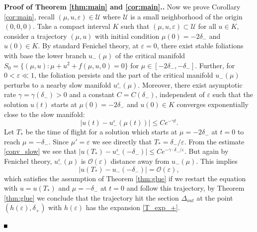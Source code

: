 \documentclass[letterpaper,11pt]{article}
\newcommand{\rmO}{\mathcal{O}}
\newcommand{\eps}{\varepsilon}
\numberwithin{equation}{section}
\theoremstyle{plain}
\newenvironment{Proof}[1][\unskip]%
 {\begin{trivlist} \item[]{\bf Proof #1. }}%
 {\hspace*{\fill}$\rule{.4\baselineskip}{.4\baselineskip}$\end{trivlist}}
\begin{document}
\begin{Proof}[\textbf{ of Theorem \ref{thm:main} and \ref{cor:main}}.]
Now we prove Corollary \ref{cor:main}, recall $(\mu,u,\eps) \in \mathcal{U}$ where $\mathcal{U}$ is a small neighborhood of the origin $(0,0,0)$. Take a compact interval $K$ such that $(\mu, u, \eps) \subset \mathcal{U}$ for all $u \in K$, consider a trajectory $(\mu, u)$ with initial condition $\mu(0) = -2\delta_-$ and $u(0) \in K$. By standard Fenichel theory, at $\eps = 0$, there exist stable foliations with base the lower branch $u_-(\mu)$ of  the critical manifold $S_0=\{ (\mu, u) : \mu+u^2 + f(\mu, u,0) =0 \}$ for $\mu \in [-2\delta_-, -\delta_-]$. Further, for $0<\eps \ll 1$, the foliation persists and the part of the critical manifold $u_-(\mu)$ perturbs to a nearby slow manifold $u_-^{\eps}(\mu)$. Moreover, there exist asymptotic rate $\gamma = \gamma(\delta_-)>0$ and a constant $C=C(\delta_-)$, independent of $\eps$ such that the solution $u(t)$ starts at $\mu(0)=-2\delta_-$ and $u(0) \in K$ converges exponentially close to the slow manifold:
\begin{equation}\label{conv_slow}
|u(t) - u_-^{\eps}(\mu(t))| \le Ce^{-\gamma t}.
\end{equation}
Let $T_*$ be the time of flight for a solution which starts at $\mu = -2\delta_-$ at $t=0$ to reach $\mu  = -\delta_-$. Since $\mu' = \eps$ we see directly that $T_* = \delta_-/\eps$. From the estimate \eqref{conv_slow} we see that $|u(T_*) - u_-^{\eps}(-\delta_-)| \le Ce^{-\gamma \cdot\delta_-/\eps}$. But again by Fenichel theory, $u_-^\eps(\mu)$ is $\rmO(\eps)$ distance away from $u_-(\mu)$. This implies
\[
|u(T_*) - u_-(-\delta_-) |  = \rmO(\eps),
\]
which satisfies the assumption of Theorem \ref{thm:glue} if we restart the equation with $u=u(T_*)$ and $\mu = -\delta_-$ at $t = 0$ and follow this trajectory, by Theorem \ref{thm:glue} we conclude that the trajectory hit the section $\Delta_{out}$ at the point $(h(\eps), \delta_+)$ with $h(\eps)$ has the expansion \eqref{T_exp_+}.


\end{Proof}
\end{document}
